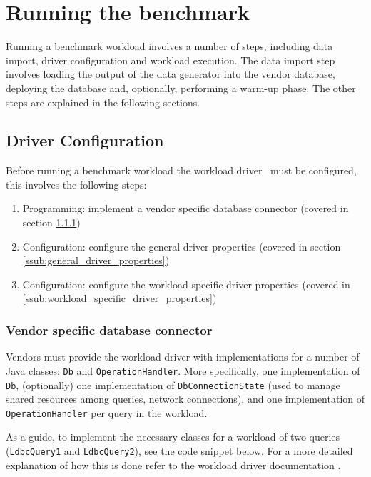 \section{Running the benchmark}

Running a benchmark workload involves a number of steps, including data import, driver configuration and workload execution.
The data import step involves loading the output of the data generator into the vendor database,
deploying the database and, optionally, performing a warm-up phase.
The other steps are explained in the following sections.

\subsection{Driver Configuration}
\label{sub:driver_configuration}

Before running a benchmark workload the workload driver~\cite{test_driver} must be configured, this involves the following steps:
\begin{enumerate}
	\item Programming: implement a vendor specific database connector (covered in section \ref{ssub:vendor_specific_database_connector})
	\item Configuration: configure the general driver properties (covered in section \ref{ssub:general_driver_properties})
	\item Configuration: configure the workload specific driver properties (covered in \ref{ssub:workload_specific_driver_properties})
\end{enumerate}

\subsubsection{Vendor specific database connector}
\label{ssub:vendor_specific_database_connector}
Vendors must provide the workload driver with implementations for a number of Java classes: \texttt{Db} and \texttt{OperationHandler}.
More specifically, one implementation of \texttt{Db},
(optionally) one implementation of \texttt{DbConnectionState} (used to manage shared resources among queries, \eg network connections),
and one implementation of \texttt{OperationHandler} per query in the workload.

As a guide, to implement the necessary classes for a workload of two queries (\texttt{LdbcQuery1} and \texttt{LdbcQuery2}),
see the code snippet below.
For a more detailed explanation of how this is done refer to the workload driver documentation \cite{test_driver}.

